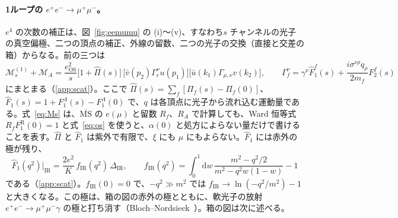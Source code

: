 \documentclass[a4paper,10pt]{ltjsarticle}
\newcommand{\dd}{\mathrm{d}}
\newcommand{\MSbar}{\overline{\mathrm{MS}}}
\newcommand{\DIR}{\Delta_{\mathrm{IR}}}
\begin{document}
\paragraph{1ループの $e^+e^-\to\mu^+\mu^-$。}$e^4$ の次数の補正は、図~\ref{fig:eemumu} の (i)〜(v)、すなわち$s$ チャンネルの光子の真空偏極、二つの頂点の補正、外線の留数、二つの光子の交換（直接と交差の箱）からなる。前の三つは
\begin{equation}
\mathcal M_s^{(1)}+\mathcal M_A=\frac{e_{\mathrm{OS}}^2}{s}\bigl[1+\hat\Pi(s)\bigr]\,\bigl[\bar v(p_2)\Gamma_e^\nu u(p_1)\bigr]\bigl[\bar u(k_1)\Gamma_{\mu,\nu}v(k_2)\bigr],\qquad
\Gamma_f^\nu=\gamma^\nu\hat F_1^f(s)+\frac{i\sigma^{\nu\rho}q_\rho}{2m_f}F_2^f(s)
\label{eq:Ms}
\end{equation}
にまとまる（\ref{app:scat}）。ここで $\hat\Pi(s)=\sum_f[\Pi_f(s)-\Pi_f(0)]$、$\hat F_1(s)=1+F_1^\Lambda(s)-F_1^\Lambda(0)$ で、$q$ は各頂点に光子から流れ込む運動量である。式~\eqref{eq:Ms} は、$\MSbar$ の $e(\mu)$ と留数 $R_f$、$R_A$ で計算しても、Ward 恒等式 $R_fF_1^{\mathrm R}(0)=1$ と式~\eqref{eq:os} を使うと、$\alpha(0)$ と処方によらない量だけで書けることを表す。$\hat\Pi$ と $\hat F_1$ は紫外で有限で、$\xi$ にも $\mu$ にもよらない。$\hat F_1$ には赤外の極が残り、
\begin{equation}
\hat F_1(q^2)\big|_{\mathrm{IR}}=\frac{2e^2}{K}\,f_{\mathrm{IR}}(q^2)\,\DIR,\qquad
f_{\mathrm{IR}}(q^2)=\int_0^1\dd w\,\frac{m^2-q^2/2}{m^2-q^2w(1-w)}-1
\label{eq:fir}
\end{equation}
である（\ref{app:scat}）。$f_{\mathrm{IR}}(0)=0$ で、$-q^2\gg m^2$ では $f_{\mathrm{IR}}\to\ln(-q^2/m^2)-1$ と大きくなる。この極は、箱の図の赤外の極とともに、軟光子の放射 $e^+e^-\to\mu^+\mu^-\gamma$ の極と打ち消す（Bloch--Nordsieck~\cite{bn}）。箱の図は次に述べる。
\end{document}
